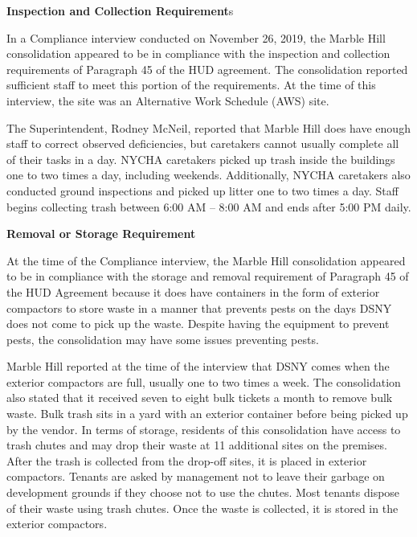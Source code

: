 
\textbf{Inspection and Collection Requirement}s



In a Compliance interview conducted on November 26, 2019, the Marble Hill consolidation appeared to be in compliance with the inspection and collection requirements of Paragraph 45 of the HUD agreement. The consolidation reported sufficient staff to meet this portion of the requirements. At the time of this interview, the site was an Alternative Work Schedule (AWS) site. 

The Superintendent, Rodney McNeil, reported that Marble Hill does have enough staff to correct observed deficiencies, but caretakers cannot usually complete all of their tasks in a day. NYCHA caretakers picked up trash inside the buildings one to two times a day, including weekends. Additionally, NYCHA caretakers also conducted ground inspections and picked up litter one to two times a day. Staff begins collecting trash between 6:00 AM -- 8:00 AM and ends after 5:00 PM daily.

\textbf{Removal or Storage Requirement}



At the time of the Compliance interview, the Marble Hill consolidation appeared to be in compliance with the storage and removal requirement of Paragraph 45 of the HUD Agreement because it does have containers in the form of exterior compactors to store waste in a manner that prevents pests on the days DSNY does not come to pick up the waste. Despite having the equipment to prevent pests, the consolidation may have some issues preventing pests.  



Marble Hill reported at the time of the interview that DSNY comes when the exterior compactors are full, usually one to two times a week. The consolidation also stated that it received seven to eight bulk tickets a month to remove bulk waste. Bulk trash sits in a yard with an exterior container before being picked up by the vendor. In terms of storage, residents of this consolidation have access to trash chutes and may drop their waste at 11 additional sites on the premises. After the trash is collected from the drop-off sites, it is placed in exterior compactors. Tenants are asked by management not to leave their garbage on development grounds if they choose not to use the chutes. Most tenants dispose of their waste using trash chutes. Once the waste is collected, it is stored in the exterior compactors.  



